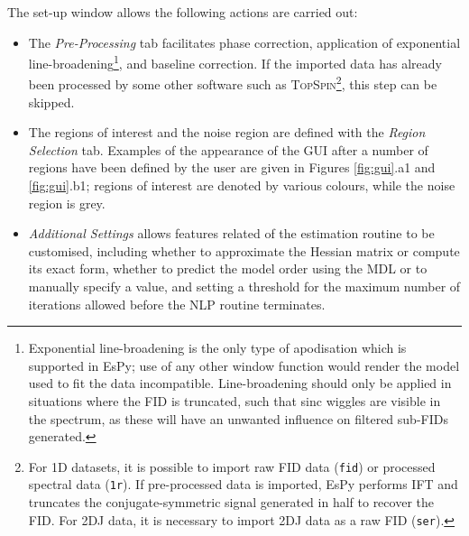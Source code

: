 The set-up window allows the following actions are carried out:
\begin{itemize}
    \item The \emph{Pre-Processing} tab facilitates phase correction,
        application of exponential line-broadening\footnote{
            Exponential line-broadening is the only type of apodisation which
            is supported in \ac{EsPy}; use of any other window function
            would render the model used to fit the data incompatible.
            Line-broadening should only be applied in
            situations where the \ac{FID} is truncated, such that sinc wiggles
            are visible in the spectrum, as these will have an unwanted
            influence on filtered sub-\acp{FID} generated.
        }, and baseline correction. If the imported data has already been
        processed by some other software such as \textsc{TopSpin}\footnote{
            For \ac{1D} datasets, it is possible to import raw \ac{FID} data
            (\texttt{fid}) or processed spectral data (\texttt{1r}). If
            pre-processed data is imported, \ac{EsPy} performs \ac{IFT} and
            truncates the conjugate-symmetric signal generated in half to
            recover the \ac{FID}. For \ac{2DJ} data, it is necessary to import
            \ac{2DJ} data as a raw \ac{FID} (\texttt{ser}).
        }, this step can be skipped.
    \item The regions of interest and the noise region are
        defined with the \emph{Region Selection} tab. Examples of the
        appearance of the \ac{GUI} after a number of regions have been defined
        by the user are given in Figures \ref{fig:gui}.a1 and \ref{fig:gui}.b1;
        regions of interest are denoted by various colours, while the noise region
        is grey.
    \item \emph{Additional Settings} allows features related of the estimation
        routine to be customised, including whether to approximate the Hessian
        matrix or compute its exact form, whether to predict the model order
        using the \ac{MDL} or to manually specify a value, and setting a
        threshold for the maximum number of iterations allowed before the
        \ac{NLP} routine terminates.
\end{itemize}

